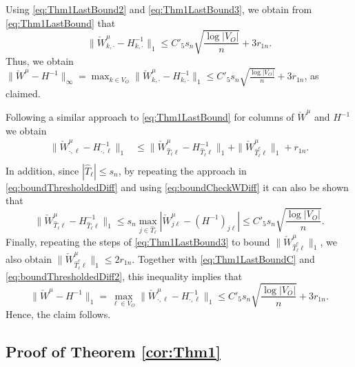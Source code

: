 \documentclass[opre,nonblindrev]{informs3} %
\begin{document}
\begin{APPENDIX}{}
	Using \eqref{eq:Thm1LastBound2} and \eqref{eq:Thm1LastBound3}, we obtain from
	\eqref{eq:Thm1LastBound}
	that
	$$
\| \check W_{k,\cdot}^\mu - H_{k,\cdot}^{-1} \|_1  \leq  C'_5 s_n \sqrt{\frac{\log |V_O|}{n}} + 3 r_{1n}.
	$$
	Thus, we obtain $
	\| \check W^\mu - H^{-1} \|_\infty =
	\max_{k\in V_O} \| \check W_{k,\cdot}^\mu - H_{k,\cdot}^{-1} \|_1 \leq C'_5 s_n \sqrt{\frac{\log |V_O|}{n}} + 3 r_{1n}$, as claimed.

Following a similar approach
to \eqref{eq:Thm1LastBound}
for columns of $\check W^\mu$ and $H^{-1}$
we obtain
\begin{equation} \label{eq:Thm1LastBoundC}
\begin{aligned}
\| \check W_{\cdot,\ell}^\mu - H_{\cdot,\ell}^{-1} \|_1
& \leq \| \check W_{ \hat{T}_\ell \ell }^\mu - H^{-1}_{\hat{T}_\ell \ell} \|_1 + \| \check W_{\hat{ T}_\ell^c \ell}^\mu\|_1 + r_{1n}.\\
\end{aligned}
\end{equation}
In addition,
since $|\hat{T}_\ell | \leq s_n$, by
repeating the approach in \eqref{eq:boundThresholdedDiff} and using
\eqref{eq:boundCheckWDiff}
 it can also be shown that
\begin{equation} \label{eq:boundThresholdedDiff2}
 \| \check W_{ \hat{T}_\ell \ell }^\mu - H^{-1}_{\hat{T}_\ell \ell} \|_1
\leq s_n \max_{j\in \hat{T}_\ell } |\check W_{j\ell}^\mu-(H^{-1})_{j\ell}| \leq
C'_5 s_n \sqrt{\frac{\log |V_O|}{n}}.
\end{equation}
Finally, repeating the steps of \eqref{eq:Thm1LastBound3} to bound
$\| \check W_{ \hat{T}_\ell^c\ell}^\mu\|_1$, we also obtain $\| \check W_{ \hat{T}_\ell^c\ell}^\mu\|_1 \leq 2 r_{1n}$.
Together with \eqref{eq:Thm1LastBoundC} and \eqref{eq:boundThresholdedDiff2}, this inequality implies that
	$$
\|\check W^\mu -H^{-1}\|_1 = \max_{\ell \in V_O}	\| \check W_{\cdot,\ell}^\mu - H_{\cdot,\ell}^{-1} \|_1  \leq  C'_5 s_n \sqrt{\frac{\log |V_O|}{n}} + 3 r_{1n}.
	$$
Hence, the claim follows.
\hfill\halmos

\endproof


\subsection{Proof of Theorem \ref{cor:Thm1}}



\end{APPENDIX}
\end{document}
